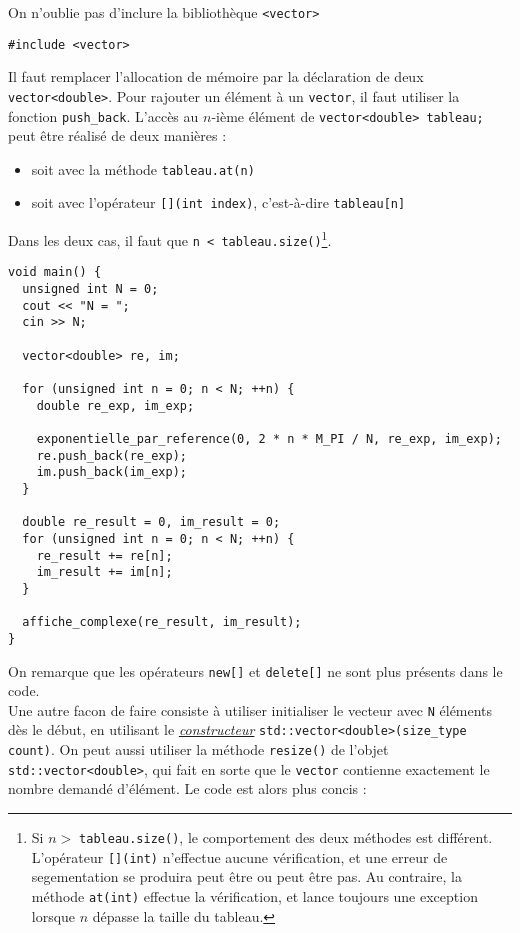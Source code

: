 \documentclass{book}
\newcommand{\inline}[1]{\texttt{#1}}
\begin{document}
\begin{correction}
On n'oublie pas d'inclure la bibliothèque \inline{<vector>}
\begin{verbatim}
#include <vector>
\end{verbatim}

Il faut remplacer l'allocation de mémoire par la déclaration de deux \inline{vector<double>}. Pour rajouter un élément à un \inline{vector}, il faut utiliser 
la fonction \inline{push_back}. L'accès au $n$-ième élément de \inline{vector<double> tableau;} peut être réalisé de deux manières :
\begin{itemize}
  \item soit avec la méthode \inline{tableau.at(n)}
  \item soit avec l'opérateur \inline{[](int index)}, c'est-à-dire \inline{tableau[n]}
\end{itemize}
Dans les deux cas, il faut que \inline{n < tableau.size()}\footnote{Si $n>\;$\inline{tableau.size()}, le comportement des deux méthodes est différent. L'opérateur \inline{[](int)} n'effectue aucune vérification, et une erreur de segementation se produira peut être ou peut être pas. Au contraire, la méthode \inline{at(int)} effectue la vérification, et lance toujours une exception lorsque $n$ dépasse la taille du tableau.}.
\begin{verbatim}
void main() {
  unsigned int N = 0;
  cout << "N = ";
  cin >> N;

  vector<double> re, im;

  for (unsigned int n = 0; n < N; ++n) {
    double re_exp, im_exp;
    
    exponentielle_par_reference(0, 2 * n * M_PI / N, re_exp, im_exp);
    re.push_back(re_exp);
    im.push_back(im_exp);
  }

  double re_result = 0, im_result = 0;
  for (unsigned int n = 0; n < N; ++n) {
    re_result += re[n];
    im_result += im[n];
  }

  affiche_complexe(re_result, im_result);
}
\end{verbatim}
On remarque que les opérateurs \inline{new[]} et \inline{delete[]} ne sont plus présents dans le code.\\

Une autre facon de faire consiste à utiliser initialiser le vecteur avec \texttt{N} éléments dès le début, en utilisant le \href{https://en.cppreference.com/w/cpp/container/vector/vector}{\textit{constructeur}} \inline{std::vector<double>(size_type count)}. On peut aussi utiliser la méthode \inline{resize()} de l'objet \inline{std::vector<double>}, qui fait en sorte que le \inline{vector} contienne exactement le nombre demandé d'élément. Le code est alors plus concis :


\end{correction}
\end{document}
